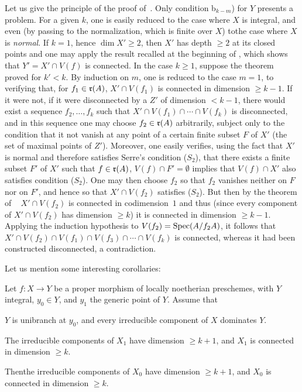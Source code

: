 Let us give the principle of the proof of~. Only condition b$_{k-m}$) for $Y$ presents a problem. For a given $k$, one is easily reduced to the case where $X$ is integral, and even (by passing to the normalization, which is finite over $X$) to\pageoriginale the case where $X$ is \emph{normal}. If $k=1$, hence $\dim X' \ge 2$, then $X'$ has depth $\ge 2$ at its closed points and one may apply the result recalled at the beginning of , which shows that \hbox{$Y'=X'\cap V(f)$} is connected. In the case $k\ge 1$, suppose the theorem proved for \hbox{$k'\!<\!k$}. By induction on $m$, one is reduced to the case $m=1$, \ie to verifying that, for $f_1\in\nobreak \mathfrak{r}(A)$, $X'\cap V(f_1)$ is connected in dimension $\ge k-1$. If it were not, \ie if it were disconnected by a $Z'$ of dimension $< k-1$, there would exist a sequence $f_2, \dotsc, f_k$ such that \hbox{$X'\cap V(f_1)\cap\dotsb\cap V(f_k)$} is disconnected, and in this sequence one may choose $f_2\in \mathfrak{r}(A)$ arbitrarily, subject only to the condition that it not vanish at any point of a certain finite subset $F$ of $X'$ (the set of maximal points of $Z'$). Moreover, one easily verifies, using the fact that $X'$ is normal and therefore satisfies Serre's condition ({$S_2$}), that there exists a finite subset $F'$ of $X'$ such that $f\in \mathfrak{r}(A)$, $V(f)\cap F'=\emptyset$ implies that $V(f)\cap X'$ also satisfies condition ({$S_2$}). One may then choose $f_2$ so that $f_2$ vanishes neither on $F$ nor on $F'$, and hence so that $X'\cap V(f_2)$ satisfies ({$S_2$}). But then\sisi{}{,} by the theorem of  ~\sisi{}{,} $X'\cap V(f_2)$ is connected in codimension~$1$ and thus (since every component of $X'\cap V(f_2)$ has dimension $\ge k$) it is connected in dimension $\ge k-1$. Applying the induction hypothesis to $V(f_2)=\operatorname{Spec}(A/f_2A)$, it follows that $X'\cap V(f_2)\cap V(f_1)\cap V(f_3)\cap \dotsb\cap V(f_k)$ is connected, whereas it had been constructed disconnected, a contradiction.

Let us mention some interesting corollaries:

\begin{corollaire} \label{XIII.2.2}
Let $f\colon X\to Y$ be a proper morphism of locally noetherian preschemes, with $Y$ integral, $y_0\in Y$, and $y_1$ the generic point of $Y$. Assume that
\begin{enumeratea}
\item
$Y$ is unibranch at $y_0$, and every irreducible component of $X$ dominates $Y$.
\item
The irreducible components of $X_1$ have dimension $\ge k+1$, and $X_1$ is connected in dimension $\ge k$.
\end{enumeratea}

Then\pageoriginale the irreducible components of $X_0$ have dimension $\ge k+1$, and $X_0$ is connected in dimension $\ge k$.
\end{corollaire}

